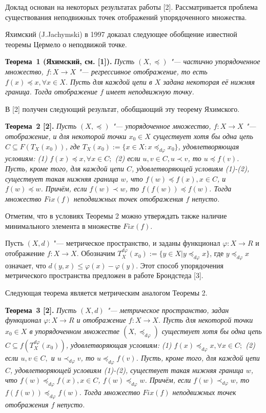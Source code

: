 \vzmscaption

Доклад основан на некоторых результатах работы [2]. Рассматривается проблема существования неподвижных точек отображений упорядоченного  множества.

Яхимский (J.Jachymski) в 1997 доказал следующее обобщение известной теоремы Цермело о неподвижой точке.

\textbf{Теорема~1 (Яхимский, см. [1]).}  {\it Пусть  $(X,\preceq)$  "--- частично упорядоченное множество,  $f: X\to X$ "--- регрессивное отображение, то есть $f(x)\preceq x, \forall x\in X$. Пусть для каждой цепи в $X$  задана некоторая её нижняя граница. Тогда отображение $f$ имеет неподвижную точку.}

В [2] получен следующий результат, обобщающий эту теорему Яхимского.

\textbf{Теорема~2 [2].} {\it Пусть $(X,\preceq)$ "--- упорядоченное множество, $f: X\to X$ "--- отображение, и для некоторой точки $x_{0}\in X$ существует хотя бы одна цепь $C\subseteq F(T_{X}(x_{0}))$, где $T_{X}(x_{0}):=\{x\in X : x\preceq_{d\varphi}x_{0}\}$, удовлетворяющая условиям: (1) $ f(x)\preceq x,\forall x\in C;$ (2) если $u,v\in C, u\prec v$, то $u\preceq f(v)$. Пусть, кроме того, для каждой цепи $C$, удовлетворяющей условиям (1)-(2), существует такая нижняя граница $w$, что $f(w)\preceq f(x), x\in C$, и $f(w)\preceq w$. Причём, если $f(w)\prec w$, то $f(f(w))\preceq f(w)$. Тогда множество $Fix(f)$ неподвижных точек отображения $f$ непусто.}

Отметим, что в условиях Теоремы 2 можно утверждать также наличие минимального элемента в множестве $Fix(f)$.


Пусть $(X,d)$ "--- метрическое пространство, и заданы функционал $\varphi: X\to R$ и отображение $f: X\to X$. Обозначим $T_{X}^{d\varphi}(x_{0}):=\{y\in X | y\preceq_{d \varphi}x\}$, где $y\preceq_{d \varphi}x$ означает, что $d(y,x)\le \varphi(x)-\varphi(y)$. Этот способ упорядочения метрического пространства предложен в работе Брондстеда [3].

Следующая теорема является метрическим аналогом Теоремы 2.

\textbf{Теорема~3 [2].} {\it  Пусть $(X,d)$ "--- метрическое пространство, задан  функционал $\varphi :X\to R$ и  отображение $f: X\to X$. Пусть для некоторой точки $x_{0}\in X$ в упорядоченном множестве $(X, \preceq_{d \varphi})$ существует хотя бы одна цепь $C\subseteq f(T_{X}^{d \varphi}(x_{0}))$, удовлетворяющая условиям: (1) $f(x)\preceq_{d \varphi} x, \forall x\in C;$ (2) если $u,v\in C,$ и $u\prec_{d \varphi} v$, то $u\preceq_{d \varphi} f(v)$. Пусть, кроме того, для каждой цепи $C$, удовлетворяющей условиям (1)-(2), существует такая нижняя граница $w$, что $f(w)\preceq_{d \varphi} f(x), x\in C$, $f(w)\preceq_{d \varphi} w$. Причём, если $f(w)\prec_{d \varphi} w$, то $f(f(w))\preceq_{d \varphi} f(w)$. Тогда множество $Fix(f)$ неподвижных точек отображения $f$ непусто.}


